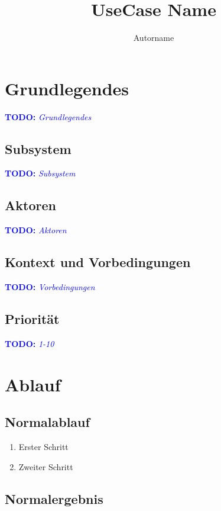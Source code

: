 \documentclass[11pt,final,hidelinks,bibliography=totoc,]{scrartcl}
\title{UseCase Name}
\author{Autorname}
\newcommand{\TODO}[1][Viel zu tun...]{\textcolor{blue}{\textbf{TODO:}} \textcolor{blue}{\textit{#1}}}
\begin{document}
\maketitle

\tableofcontents

\section{Grundlegendes}

\TODO[Grundlegendes]

\subsection{Subsystem}

\TODO[Subsystem]

\subsection{Aktoren}

\TODO[Aktoren]

\subsection{Kontext und Vorbedingungen}

\TODO[Vorbedingungen]

\subsection{Priorität}

\TODO[1-10]

\section{Ablauf}

\subsection{Normalablauf}

\begin{enumerate}
\item Erster Schritt
\item Zweiter Schritt
\end{enumerate}

\subsection{Normalergebnis}
\end{document}
